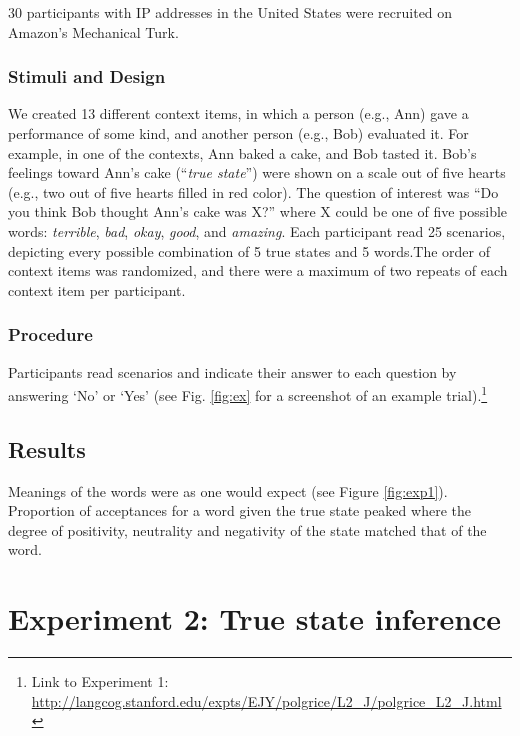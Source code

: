 \documentclass[10pt,letterpaper]{article}
\newcommand{\ndg}[1]{\textcolor{Green}{[ndg: #1]}}
\begin{document}
30 participants with IP addresses in the United States were recruited on Amazon's Mechanical Turk. 

\subsubsection{Stimuli and Design}

We created 13 different context items, in which a person (e.g., Ann) gave a performance of some kind, and another person (e.g., Bob) evaluated it. For example, in one of the contexts, Ann baked a cake, and Bob tasted it. Bob's feelings toward Ann's cake (``\emph{true state}'') were shown on a scale out of five hearts (e.g., two out of five hearts filled in red color). The question of interest was ``Do you think Bob thought Ann's cake was X?'' where X could be one of five possible words: \emph{terrible}, \emph{bad}, \emph{okay}, \emph{good}, and \emph{amazing}. Each participant read 25 scenarios, depicting every possible combination of 5 true states and 5 words.The order of context items was randomized, and there were a maximum of two repeats of each context item per participant.

\subsubsection{Procedure}

Participants read scenarios and indicate their answer to each question by answering `No' or `Yes' (see Fig. \ref{fig:ex} for a screenshot of an example trial).\footnote{Link to Experiment 1: \url{http://langcog.stanford.edu/expts/EJY/polgrice/L2_J/polgrice_L2_J.html}} 

\subsection{Results}


Meanings of the words were as one would expect (see Figure \ref{fig:exp1}). 
Proportion of acceptances for a word given the true state peaked where the degree of positivity, neutrality and negativity of the state matched that of the word. 

\section{Experiment 2: True state inference}
\end{document}
